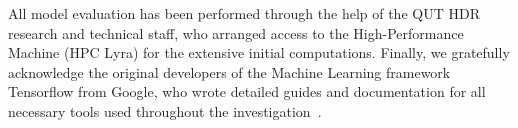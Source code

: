 All model evaluation has been performed through the help of the QUT HDR research and technical staff, who arranged access to the High-Performance Machine (HPC Lyra) for the extensive initial computations.
Finally, we gratefully acknowledge the original developers of the Machine Learning framework Tensorflow from Google, who wrote detailed guides and documentation for all necessary tools used throughout the investigation~\cite{tensorflow2015-whitepaper}.
